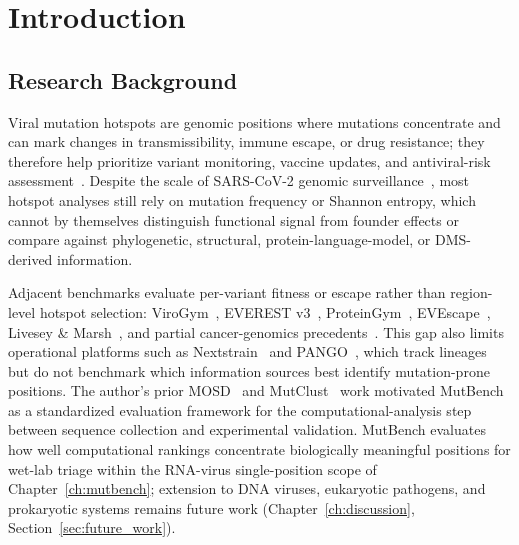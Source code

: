 \chapter{Introduction}
\label{ch:introduction}

\section{Research Background}
\label{sec:intro_background}

Viral mutation hotspots are genomic positions where mutations concentrate and can mark changes in transmissibility, immune escape, or drug resistance; they therefore help prioritize variant monitoring, vaccine updates, and antiviral-risk assessment~\cite{harvey2021tracking,carabelli2023convergent}.
Despite the scale of SARS-CoV-2 genomic surveillance~\cite{harvey2021tracking}, most hotspot analyses still rely on mutation frequency or Shannon entropy, which cannot by themselves distinguish functional signal from founder effects or compare against phylogenetic, structural, protein-language-model, or DMS-derived information.

Adjacent benchmarks evaluate per-variant fitness or escape rather than region-level hotspot selection: ViroGym~\cite{virogym2026}, EVEREST v3~\cite{gurev2026everest_v3}, ProteinGym~\cite{notin2023proteingym,notin2025proteingym_v13}, EVEscape~\cite{thadani2023evescape}, Livesey \& Marsh~\cite{livesey2020using}, and partial cancer-genomics precedents~\cite{bailey2018comprehensive}.
This gap also limits operational platforms such as Nextstrain~\cite{nextstrain2018hadfield} and PANGO~\cite{rambaut2020pangolin}, which track lineages but do not benchmark which information sources best identify mutation-prone positions.
The author's prior MOSD~\cite{han2025mosd} and MutClust~\cite{youn2025mutclust} work motivated MutBench as a standardized evaluation framework for the computational-analysis step between sequence collection and experimental validation.
MutBench evaluates how well computational rankings concentrate biologically meaningful positions for wet-lab triage within the RNA-virus single-position scope of Chapter~\ref{ch:mutbench}; extension to DNA viruses, eukaryotic pathogens, and prokaryotic systems remains future work (Chapter~\ref{ch:discussion}, Section~\ref{sec:future_work}).



